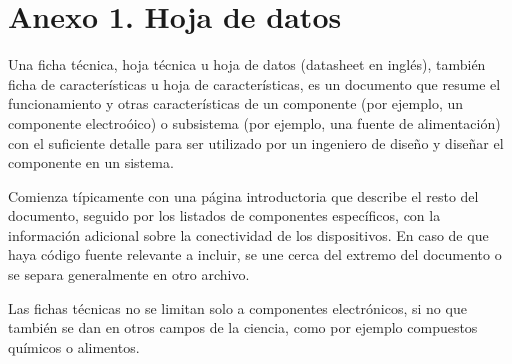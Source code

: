 \chapter{Anexo 1. Hoja de datos}\label{anexo1}

Una ficha técnica, hoja técnica u hoja de datos (datasheet en inglés), también ficha de características u hoja de características, es un documento que resume el funcionamiento y otras características de un componente (por ejemplo, un componente electroóico) o subsistema (por ejemplo, una fuente de alimentación) con el suficiente detalle para ser utilizado por un ingeniero de diseño y diseñar el componente en un sistema.

Comienza típicamente con una página introductoria que describe el resto del documento, seguido por los listados de componentes específicos, con la información adicional sobre la conectividad de los dispositivos. En caso de que haya código fuente relevante a incluir, se une cerca del extremo del documento o se separa generalmente en otro archivo.

Las fichas técnicas no se limitan solo a componentes electrónicos, si no que también se dan en otros campos de la ciencia, como por ejemplo compuestos químicos o alimentos.

\bigskip






\endinput 